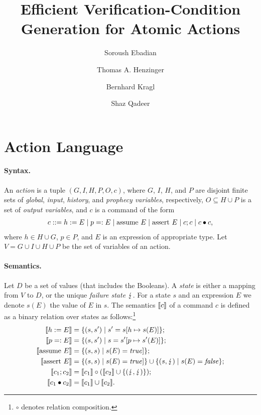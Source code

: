 \documentclass[runningheads,orivec]{llncs}
\begin{document}
\title{Efficient Verification-Condition Generation for Atomic Actions}

\author{%
Soroush Ebadian \and
Thomas A. Henzinger \and
Bernhard Kragl \and
Shaz Qadeer}



\maketitle

\section{Action Language}

\paragraph{Syntax.}
%
An \emph{action} is a tuple $(G,I,H,P,O,c)$, where $G$, $I$, $H$, and $P$ are disjoint finite sets of \emph{global}, \emph{input}, \emph{history}, and \emph{prophecy variables}, respectively, $O \subseteq H \cup P$ is a set of \emph{output variables}, and $c$ is a command of the form
%
\begin{align*}
  c ::= h := E \mid p =: E \mid \mathrm{assume}\ E \mid \mathrm{assert}\ E \mid c ; c \mid c \bullet c,
\end{align*}
%
where $h \in H \cup G$, $p \in P$, and $E$ is an expression of appropriate type.
Let $V = G \cup I \cup H \cup P$ be the set of variables of an action.

\paragraph{Semantics.}
%
Let $D$ be a set of values (that includes the Booleans).
A \emph{state} is either a mapping from $V$ to $D$, or the unique \emph{failure state} $\lightning$.
For a state $s$ and an expression $E$ we denote $s(E)$ the value of $E$ in $s$.
The semantics $\llbracket c \rrbracket$ of a command $c$ is defined as a binary relation over states as follows:\footnote{$\circ$ denotes relation composition.}
%
\begin{align*}
  \llbracket h := E \rrbracket &= \{ (s,s') \mid s' = s[h \mapsto s(E)] \}; \\
  \llbracket p =: E \rrbracket &= \{ (s,s') \mid s = s'[p \mapsto s'(E)] \}; \\
  \llbracket \mathrm{assume}\ E \rrbracket &= \{ (s,s) \mid s(E) = \mathit{true}] \}; \\
  \llbracket \mathrm{assert}\ E \rrbracket &= \{ (s,s) \mid s(E) = \mathit{true}] \} \cup \{ (s,\lightning) \mid s(E) = \mathit{false} \}; \\
  \llbracket c_1 ; c_2 \rrbracket &= \llbracket c_1 \rrbracket \circ (\llbracket c_2 \rrbracket \cup \{ (\lightning,\lightning) \}); \\
  \llbracket c_1 \bullet c_2 \rrbracket &= \llbracket c_1 \rrbracket \cup \llbracket c_2 \rrbracket. \\
\end{align*}
\end{document}
